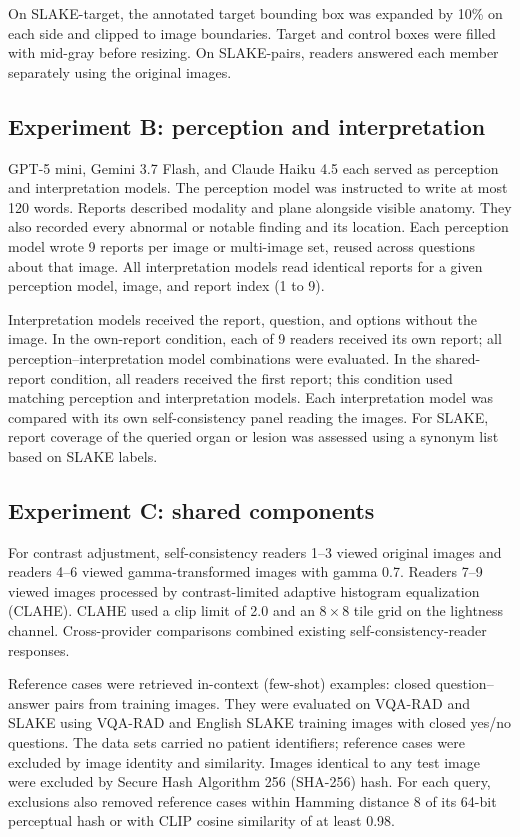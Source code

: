 On SLAKE-target, the annotated target bounding box was expanded by 10\% on each side and clipped to image boundaries.
Target and control boxes were filled with mid-gray before resizing.
On SLAKE-pairs, readers answered each member separately using the original images.

\subsection{Experiment B: perception and interpretation}
GPT-5 mini, Gemini 3.7 Flash, and Claude Haiku 4.5 each served as perception and interpretation models.
The perception model was instructed to write at most 120 words.
Reports described modality and plane alongside visible anatomy.
They also recorded every abnormal or notable finding and its location.
Each perception model wrote 9 reports per image or multi-image set, reused across questions about that image.
All interpretation models read identical reports for a given perception model, image, and report index (1 to 9).

Interpretation models received the report, question, and options without the image.
In the own-report condition, each of 9 readers received its own report; all perception--interpretation model combinations were evaluated.
In the shared-report condition, all readers received the first report; this condition used matching perception and interpretation models.
Each interpretation model was compared with its own self-consistency panel reading the images.
For SLAKE, report coverage of the queried organ or lesion was assessed using a synonym list based on SLAKE labels.

\subsection{Experiment C: shared components}
For contrast adjustment, self-consistency readers 1--3 viewed original images and readers 4--6 viewed gamma-transformed images with gamma 0.7.
Readers 7--9 viewed images processed by contrast-limited adaptive histogram equalization (CLAHE).\cite{zuiderveld1994clahe}
CLAHE used a clip limit of 2.0 and an $8\times8$ tile grid on the lightness channel.
Cross-provider comparisons combined existing self-consistency-reader responses.

Reference cases were retrieved in-context (few-shot) examples: closed question--answer pairs from training images.
They were evaluated on VQA-RAD and SLAKE using VQA-RAD and English SLAKE training images with closed yes/no questions.
The data sets carried no patient identifiers; reference cases were excluded by image identity and similarity.
Images identical to any test image were excluded by Secure Hash Algorithm 256 (SHA-256) hash.
For each query, exclusions also removed reference cases within Hamming distance 8 of its 64-bit perceptual hash or with CLIP cosine similarity of at least 0.98.

